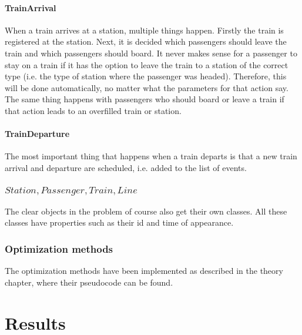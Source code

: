 \documentclass[10pt]{report}
\begin{document}
\subsubsection{TrainArrival}
When a train arrives at a station, multiple things happen. Firstly the train is registered at the station. Next, it is decided which passengers should leave the train and which passengers should board. It never makes sense for a passenger to stay on a train if it has the option to leave the train to a station of the correct type (i.e. the type of station where the passenger was headed). Therefore, this will be done automatically, no matter what the parameters for that action say. The same thing happens with passengers who should board or leave a train if that action leads to an overfilled train or station.

\subsubsection{TrainDeparture}
The most important thing that happens when a train departs is that a new train arrival and departure are scheduled, i.e. added to the list of events.


\subsection{$Station, Passenger, Train, Line$}
The clear objects in the problem of course also get their own classes. All these classes have properties such as their id and time of appearance. 

\subsection{Optimization methods}
The optimization methods have been implemented as described in the theory chapter, where their pseudocode can be found.


\chapter{Results}
\end{document}
